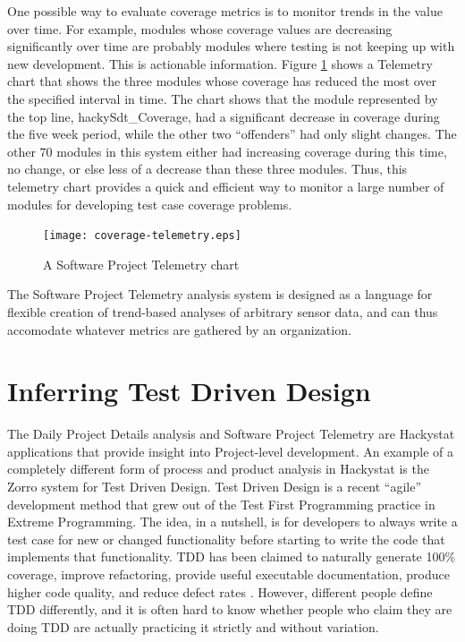 \documentclass[12pt]{article}
\begin{document}
One possible way to evaluate coverage metrics is to monitor trends in the
value over time.  For example, modules whose coverage values are decreasing
significantly over time are probably modules where testing is not keeping
up with new development.  This is actionable information.  Figure
\ref{fig:telemetry} shows a Telemetry chart that shows the three modules
whose coverage has reduced the most over the specified interval in time.
The chart shows that the module represented by the top line,
hackySdt\_Coverage, had a significant decrease in coverage during the five
week period, while the other two ``offenders'' had only slight changes.
The other 70 modules in this system either had increasing coverage during
this time, no change, or else less of a decrease than these three modules.  Thus,
this telemetry chart provides a quick and efficient way to monitor a large
number of modules for developing test case coverage problems. 

\begin{figure}[t]
  \centering
  \texttt{[image: coverage-telemetry.eps]}
  \caption{A Software Project Telemetry chart}
  \label{fig:telemetry}
\end{figure}

The Software Project Telemetry analysis system is designed as a language
for flexible creation of trend-based analyses of arbitrary sensor data, and
can thus accomodate whatever metrics are gathered by an organization.

\section{Inferring Test Driven Design}

The Daily Project Details analysis and Software Project Telemetry are
Hackystat applications that provide insight into Project-level development.
An example of a completely different form of process and product analysis
in Hackystat is the Zorro system for Test Driven Design.  Test Driven
Design is a recent ``agile'' development method that grew out of the Test
First Programming practice in Extreme Programming. The idea, in a nutshell,
is for developers to always write a test case for new or changed
functionality before starting to write the code that implements that
functionality.  TDD has been claimed to naturally generate 100\% coverage,
improve refactoring, provide useful executable documentation, produce
higher code quality, and reduce defect rates
\cite{Beck:03,George:03,Maximilien:03}.  However, different people define TDD 
differently, and it is often hard to know whether people who claim they are doing 
TDD are actually practicing it strictly and without variation. 
\end{document}
